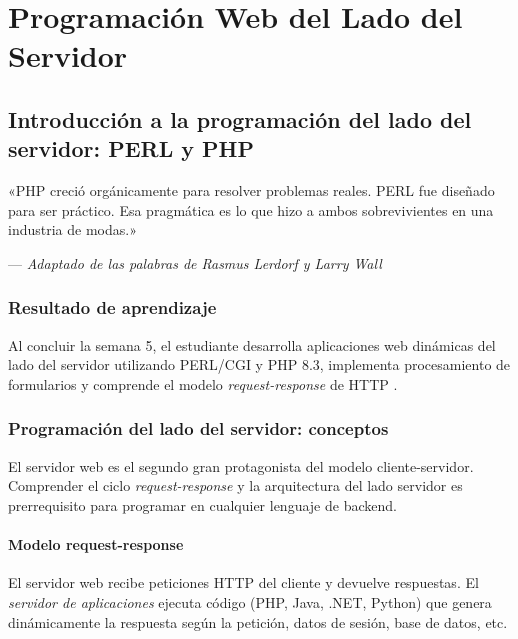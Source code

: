 \documentclass[11pt,a4paper,openany]{book}
\begin{document}
\part{Programación Web del Lado del Servidor}
\label{parte:unidad2}


\chapter{Introducción a la programación del lado del servidor: PERL y PHP}
\label{cap:semana5}

\epigraph{«PHP creció orgánicamente para resolver problemas reales.
PERL fue diseñado para ser práctico. Esa pragmática es lo que hizo a
ambos sobrevivientes en una industria de modas.»}{--- \textit{Adaptado
de las palabras de Rasmus Lerdorf y Larry Wall}}

\section*{Resultado de aprendizaje}
Al concluir la semana 5, el estudiante desarrolla aplicaciones web
dinámicas del lado del servidor utilizando PERL/CGI y PHP 8.3,
implementa procesamiento de formularios y comprende el modelo
\emph{request-response} de HTTP \cite{nixon2021learning}.

\section{Programación del lado del servidor: conceptos}

El servidor web es el segundo gran protagonista del modelo
cliente-servidor. Comprender el ciclo \emph{request-response} y la
arquitectura del lado servidor es prerrequisito para programar en
cualquier lenguaje de backend.


\subsection{Modelo request-response}

El servidor web recibe peticiones HTTP del cliente y devuelve
respuestas. El \emph{servidor de aplicaciones} ejecuta código
(PHP, Java, .NET, Python) que genera dinámicamente la respuesta
según la petición, datos de sesión, base de datos, etc.
\end{document}
